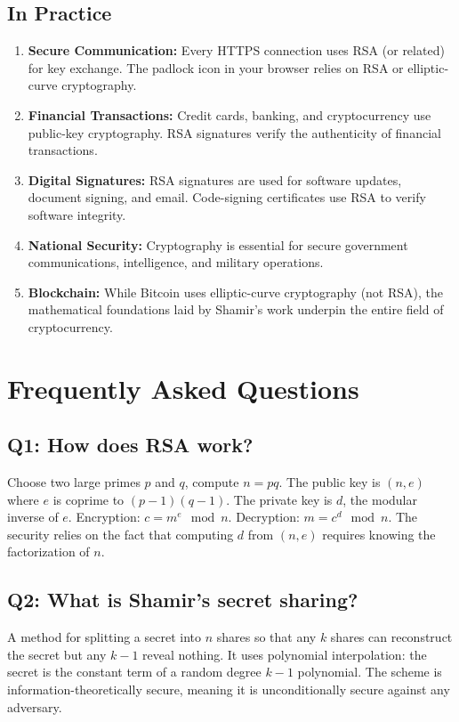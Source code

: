 \subsection{In Practice}

\begin{enumerate}
    \item \textbf{Secure Communication:} Every HTTPS connection uses RSA (or related) for key exchange. The padlock icon in your browser relies on RSA or elliptic-curve cryptography.
    \item \textbf{Financial Transactions:} Credit cards, banking, and cryptocurrency use public-key cryptography. RSA signatures verify the authenticity of financial transactions.
    \item \textbf{Digital Signatures:} RSA signatures are used for software updates, document signing, and email. Code-signing certificates use RSA to verify software integrity.
    \item \textbf{National Security:} Cryptography is essential for secure government communications, intelligence, and military operations.
    \item \textbf{Blockchain:} While Bitcoin uses elliptic-curve cryptography (not RSA), the mathematical foundations laid by Shamir's work underpin the entire field of cryptocurrency.
\end{enumerate}

\section{Frequently Asked Questions}

\subsection*{Q1: How does RSA work?}
Choose two large primes $p$ and $q$, compute $n = pq$. The public key is $(n, e)$ where $e$ is coprime to $(p-1)(q-1)$. The private key is $d$, the modular inverse of $e$. Encryption: $c = m^e \mod n$. Decryption: $m = c^d \mod n$. The security relies on the fact that computing $d$ from $(n, e)$ requires knowing the factorization of $n$.

\subsection*{Q2: What is Shamir's secret sharing?}
A method for splitting a secret into $n$ shares so that any $k$ shares can reconstruct the secret but any $k-1$ reveal nothing. It uses polynomial interpolation: the secret is the constant term of a random degree $k-1$ polynomial. The scheme is information-theoretically secure, meaning it is unconditionally secure against any adversary.

